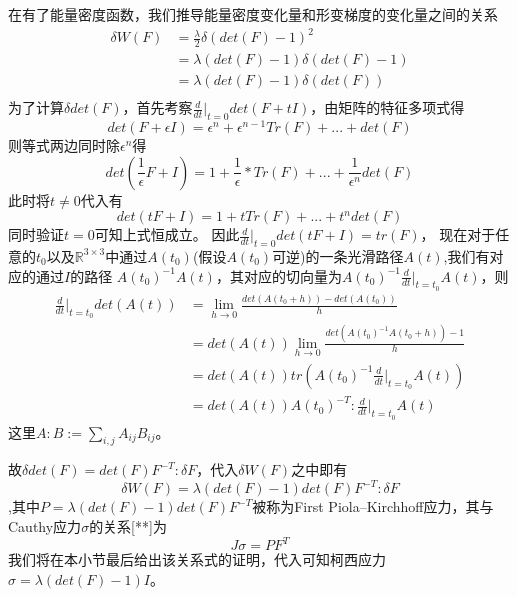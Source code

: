 在有了能量密度函数，我们推导能量密度变化量和形变梯度的变化量之间的关系
\begin{equation}
    \begin{split}
        \delta W(F)&= \frac{\lambda}{2}\delta (det(F) - 1)^2\\
        &= \lambda (det(F) - 1) \delta(det(F) - 1)\\
        &= \lambda (det(F) - 1) \delta(det(F)) \nonumber\\
    \end{split}
\end{equation}
为了计算$\delta det(F)$，首先考察$\frac{d}{dt}\Big |_{t = 0}det(F + tI)$，由矩阵的特征多项式得
$$det(F + \epsilon I) = \epsilon ^n + \epsilon ^{n-1}Tr(F) + ... + det(F)$$
则等式两边同时除$\epsilon^n$得
$$det(\frac{1}{\epsilon}F + I) = 1 + \frac{1}{\epsilon} * Tr(F) + ... + \frac{1}{\epsilon^n} det(F)$$
此时将$t\neq 0$代入有
$$det(tF + I) = 1 + t Tr(F) + ... + t^ndet(F)$$
同时验证$t=0$可知上式恒成立。
因此$\frac{d}{dt}\Big |_{t = 0}det(tF + I) = tr(F)$，
现在对于任意的$t_0$以及$\mathbb{R}^{3 \times 3}$中通过$A(t_0)$(假设$A(t_0)$可逆)的一条光滑路径$A(t)$,我们有对应的通过$I$的路径
$A(t_0)^{-1}A(t)$，其对应的切向量为$A(t_0)^{-1}\frac{d}{dt}\Big |_{t=t_0}A(t)$，则
\begin{equation}
    \begin{split}
        \frac{d}{dt}\Big |_{t = t_0} det(A(t)) &= \lim_{h \to 0} \frac{det(A(t_0 + h)) - det(A(t_0))}{h}\\
        &=det(A(t)) \lim_{h\to 0} \frac{det(A(t_0)^{-1}A(t_0 + h)) -1}{h}\\
        &= det(A(t))tr(A(t_0)^{-1}\frac{d}{dt}\Big |_{t=t_0}A(t))\\
        &= det(A(t))A(t_0)^{-T}:\frac{d}{dt}\Big |_{t=t_0}A(t)
    \end{split}
\end{equation}
这里$A:B:=\sum_{i,j}A_{ij}B_{ij}$。

故$\delta det(F) = det(F) F^{-T}:\delta F$，代入$\delta W(F)$之中即有$$\delta W(F) = \lambda (det(F) - 1)det(F) F^{-T}:\delta F$$
,其中$P = \lambda (det(F) - 1)det(F)F^{-T}$被称为First Piola–Kirchhoff应力，其与Cauthy应力$\sigma$的关系[**]为
$$J\sigma = PF^{T}$$
我们将在本小节最后给出该关系式的证明，代入可知柯西应力$\sigma = \lambda (det(F) - 1)I$。


